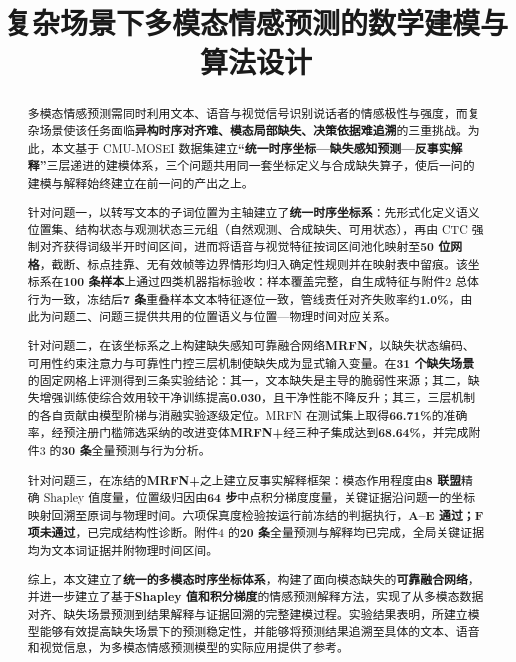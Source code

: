 \documentclass[colorprint,nocoverzero]{gmcmthesis}
\title{复杂场景下多模态情感预测的数学建模与算法设计}
\begin{document}
\maketitle                    %

\begin{abstract}
多模态情感预测需同时利用文本、语音与视觉信号识别说话者的情感极性与强度，而复杂场景使该任务面临\textbf{异构时序对齐难、模态局部缺失、决策依据难追溯}的三重挑战。为此，本文基于 CMU-MOSEI 数据集建立\textbf{``统一时序坐标—缺失感知预测—反事实解释''}三层递进的建模体系，三个问题共用同一套坐标定义与合成缺失算子，使后一问的建模与解释始终建立在前一问的产出之上。

针对问题一，以转写文本的子词位置为主轴建立了\textbf{统一时序坐标系}：先形式化定义语义位置集、结构状态与观测状态三元组（自然观测、合成缺失、可用状态），再由 CTC 强制对齐获得词级半开时间区间，进而将语音与视觉特征按词区间池化映射至\textbf{50 位网格}，截断、标点挂靠、无有效帧等边界情形均归入确定性规则并在映射表中留痕。该坐标系在\textbf{100 条样本}上通过四类机器指标验收：样本覆盖完整，自生成特征与附件2 总体行为一致，冻结后\textbf{7 条}重叠样本文本特征逐位一致，管线责任对齐失败率约\textbf{1.0\%}，由此为问题二、问题三提供共用的位置语义与位置—物理时间对应关系。

针对问题二，在该坐标系之上构建缺失感知可靠融合网络\textbf{MRFN}，以缺失状态编码、可用性约束注意力与可靠性门控三层机制使缺失成为显式输入变量。在\textbf{31 个缺失场景}的固定网格上评测得到三条实验结论：其一，文本缺失是主导的脆弱性来源；其二，缺失增强训练使综合效用较干净训练提高\textbf{0.030}，且干净性能不降反升；其三，三层机制的各自贡献由模型阶梯与消融实验逐级定位。MRFN 在测试集上取得\textbf{66.71\%}的准确率，经预注册门槛筛选采纳的改进变体\textbf{MRFN+}经三种子集成达到\textbf{68.64\%}，并完成附件3 的\textbf{30 条}全量预测与行为分析。

针对问题三，在冻结的\textbf{MRFN+}之上建立反事实解释框架：模态作用程度由\textbf{8 联盟}精确 Shapley 值度量，位置级归因由\textbf{64 步}中点积分梯度度量，关键证据沿问题一的坐标映射回溯至原词与物理时间。六项保真度检验按运行前冻结的判据执行，\textbf{A--E 通过；F 项未通过}，已完成结构性诊断。附件4 的\textbf{20 条}全量预测与解释均已完成，全局关键证据均为文本词证据并附物理时间区间。

综上，本文建立了\textbf{统一的多模态时序坐标体系}，构建了面向模态缺失的\textbf{可靠融合网络}，并进一步建立了基于\textbf{Shapley 值和积分梯度}的情感预测解释方法，实现了从多模态数据对齐、缺失场景预测到结果解释与证据回溯的完整建模过程。实验结果表明，所建立模型能够有效提高缺失场景下的预测稳定性，并能够将预测结果追溯至具体的文本、语音和视觉信息，为多模态情感预测模型的实际应用提供了参考。
\end{abstract}
\end{document}
